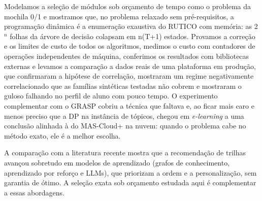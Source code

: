 \documentclass[12pt,a4paper]{article}
\newcommand{\secao}[1]{\par\vspace{1.2em}\noindent{\bfseries #1}\par\vspace{0.8em}\nopagebreak}
\begin{document}
\secao{12 CONCLUSÃO}
Modelamos a seleção de módulos sob orçamento de tempo como o problema da mochila 0/1 e mostramos que, no problema relaxado sem pré-requisitos, a programação dinâmica é a enumeração exaustiva do RUTICO com memória: as 2\ensuremath{^{n}} folhas da árvore de decisão colapsam em n(T+1) estados. Provamos a correção e os limites de custo de todos os algoritmos, medimos o custo com contadores de operações independentes de máquina, conferimos os resultados com bibliotecas externas e levamos a comparação a dados reais de uma plataforma em produção, que confirmaram a hipótese de correlação, mostraram um regime negativamente correlacionado que as famílias sintéticas testadas não cobrem e mostraram o guloso falhando no perfil de aluno com pouco tempo. O experimento complementar com o GRASP cobriu a técnica que faltava e, ao ficar mais caro e menos preciso que a DP na instância de tópicos, chegou em \textit{e-learning} a uma conclusão alinhada à do MAS-Cloud+ na nuvem: quando o problema cabe no método exato, ele é a melhor escolha.

A comparação com a literatura recente mostra que a recomendação de trilhas avançou sobretudo em modelos de aprendizado (grafos de conhecimento, aprendizado por reforço e LLMs), que priorizam a ordem e a personalização, sem garantia de ótimo. A seleção exata sob orçamento estudada aqui é complementar a essas abordagens.
\end{document}
